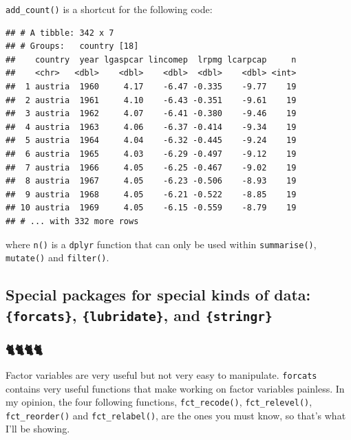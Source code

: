 \documentclass[]{gitbook}
\newenvironment{Shaded}{\begin{snugshade}}{\end{snugshade}}
\newcommand{\DataTypeTok}[1]{\textcolor[rgb]{0.13,0.29,0.53}{#1}}
\newcommand{\KeywordTok}[1]{\textcolor[rgb]{0.13,0.29,0.53}{\textbf{#1}}}
\newcommand{\NormalTok}[1]{#1}
\newcommand{\OperatorTok}[1]{\textcolor[rgb]{0.81,0.36,0.00}{\textbf{#1}}}
\newcommand{\StringTok}[1]{\textcolor[rgb]{0.31,0.60,0.02}{#1}}
\begin{document}
\texttt{add\_count()} is a shortcut for the following code:

\begin{Shaded}
\end{Shaded}

\begin{verbatim}
## # A tibble: 342 x 7
## # Groups:   country [18]
##    country  year lgaspcar lincomep  lrpmg lcarpcap     n
##    <chr>   <dbl>    <dbl>    <dbl>  <dbl>    <dbl> <int>
##  1 austria  1960     4.17    -6.47 -0.335    -9.77    19
##  2 austria  1961     4.10    -6.43 -0.351    -9.61    19
##  3 austria  1962     4.07    -6.41 -0.380    -9.46    19
##  4 austria  1963     4.06    -6.37 -0.414    -9.34    19
##  5 austria  1964     4.04    -6.32 -0.445    -9.24    19
##  6 austria  1965     4.03    -6.29 -0.497    -9.12    19
##  7 austria  1966     4.05    -6.25 -0.467    -9.02    19
##  8 austria  1967     4.05    -6.23 -0.506    -8.93    19
##  9 austria  1968     4.05    -6.21 -0.522    -8.85    19
## 10 austria  1969     4.05    -6.15 -0.559    -8.79    19
## # ... with 332 more rows
\end{verbatim}

where \texttt{n()} is a \texttt{dplyr} function that can only be used within \texttt{summarise()}, \texttt{mutate()} and
\texttt{filter()}.

\hypertarget{special-packages-for-special-kinds-of-data-forcats-lubridate-and-stringr}{%
\subsection{\texorpdfstring{Special packages for special kinds of data: \texttt{\{forcats\}}, \texttt{\{lubridate\}}, and \texttt{\{stringr\}}}{Special packages for special kinds of data: \{forcats\}, \{lubridate\}, and \{stringr\}}}\label{special-packages-for-special-kinds-of-data-forcats-lubridate-and-stringr}}

\hypertarget{section}{%
\subsubsection{🐈🐈🐈🐈}\label{section}}

Factor variables are very useful but not very easy to manipulate. \texttt{forcats} contains very useful
functions that make working on factor variables painless. In my opinion, the four following functions, \texttt{fct\_recode()}, \texttt{fct\_relevel()}, \texttt{fct\_reorder()} and \texttt{fct\_relabel()}, are the ones you must
know, so that's what I'll be showing.
\end{document}
